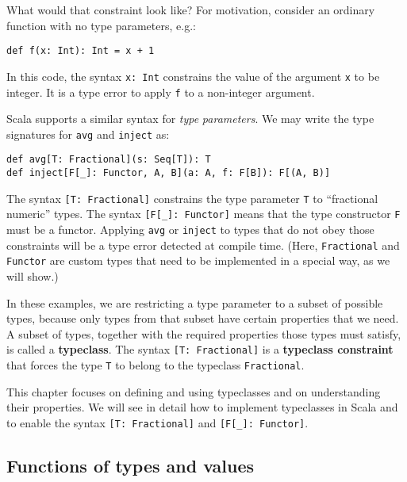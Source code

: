 What would that constraint look like? For motivation, consider an
ordinary function with no type parameters, e.g.:
\begin{lstlisting}
def f(x: Int): Int = x + 1
\end{lstlisting}
In this code, the syntax \lstinline!x: Int! constrains the value
of the argument \lstinline!x! to be integer. It is a type error to
apply \lstinline!f! to a non-integer argument. 

Scala supports a similar syntax for \emph{type} \emph{parameters}.
We may write the type signatures for \lstinline!avg! and \lstinline!inject!
as:
\begin{lstlisting}
def avg[T: Fractional](s: Seq[T]): T
def inject[F[_]: Functor, A, B](a: A, f: F[B]): F[(A, B)]
\end{lstlisting}
The syntax \lstinline![T: Fractional]! constrains the type parameter
\lstinline!T! to \textsf{``}fractional numeric\textsf{''} types. The syntax \lstinline![F[_]: Functor]!
means that the type constructor \lstinline!F! must be a functor.
Applying \lstinline!avg! or \lstinline!inject! to types that do
not obey those constraints will be a type error detected at compile
time. (Here, \lstinline!Fractional! and \lstinline!Functor! are
custom types that need to be implemented in a special way, as we will
show.) 

In these examples, we are restricting a type parameter to a subset
of possible types, because only types from that subset have certain
properties that we need. A subset of types, together with the required
properties those types must satisfy, is called a \textbf{typeclass}.
The syntax \lstinline![T: Fractional]! is a \textbf{typeclass constraint}
that forces the type \lstinline!T! to belong to the typeclass \lstinline!Fractional!. 

This chapter focuses on defining and using typeclasses and on understanding
their properties. We will see in detail how to implement typeclasses
in Scala and to enable the syntax \lstinline![T: Fractional]! and
\lstinline![F[_]: Functor]!.

\subsection{Functions of types and values}

